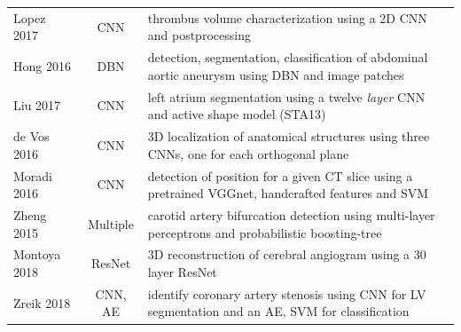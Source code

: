 \documentclass[journal]{IEEEtran}
\begin{document}
\begin{table}[!t]
\begin{minipage}{\textwidth}
\begin{tabularx}{\textwidth}{l c l}
			Lopez 2017\cite{lopez2017dcnn}               & CNN             & thrombus volume characterization using a 2D CNN and postprocessing                                                                                                                                                               \\
			Hong 2016\cite{hong2016automatic}            & DBN             & detection, segmentation, classification of abdominal aortic aneurysm using DBN and image patches                                                                                                                                 \\
			Liu 2017\cite{liu2017left}                   & CNN             & left atrium segmentation using a twelve \textit{layer} CNN and active shape model (STA13)                                                                                                                                        \\
			de Vos 2016\cite{de20162d}                   & CNN             & 3D localization of anatomical structures using three CNNs, one for each orthogonal plane                                                                                                                                         \\
			Moradi 2016\cite{moradi2016hybrid}           & CNN             & detection of position for a given CT slice using a pretrained VGGnet, handcrafted features and SVM                                                                                                                               \\
			Zheng 2015\cite{zheng20153d}                 & Multiple        & carotid artery bifurcation detection using multi-layer perceptrons and probabilistic boosting-tree                                                                                                                               \\
			Montoya 2018\cite{montoya2018deep}           & ResNet          & 3D reconstruction of cerebral angiogram using a 30 layer ResNet                                                                                                                                                                  \\
			Zreik 2018\cite{zreik2018deep}               & CNN, AE         & identify coronary artery stenosis using CNN for LV segmentation and an AE, SVM for classification                                                                                                                                \\

\end{tabularx}
\end{minipage}
\end{table}
\end{document}
